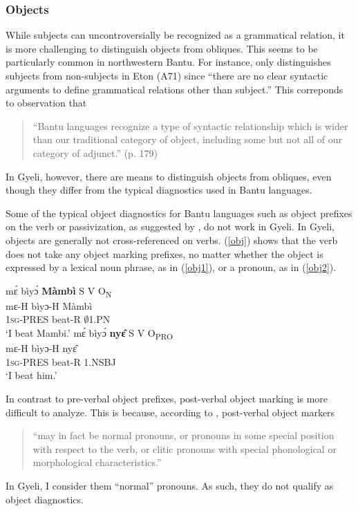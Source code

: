 \subsubsection{Objects}
\label{sec:HLinker}

While subjects can uncontroversially be recognized as a grammatical relation, it is more challenging to distinguish objects from obliques. This seems to be particularly common in northwestern Bantu. For instance, \citet[287]{velde2008} only distinguishes subjects from non-subjects in Eton (A71) since ``there are no clear syntactic arguments to define grammatical relations other than subject.'' This correponds to  observation that 
\begin{quote}
``Bantu languages recognize a type of syntactic relationship which is wider than our traditional category of object, including some but not all of our category of adjunct.'' (p. 179) \end{quote}
 In Gyeli, however, there are means to distinguish objects from obliques, even though they differ from the typical diagnostics used in Bantu languages.


Some of the typical object diagnostics for Bantu languages such as object prefixes on the verb or passivization, as suggested by \citet{schadeberg95}, do not work in Gyeli.  In Gyeli, objects are generally not cross-referenced on verbs.  (\ref{obj}) shows that the verb does not take any object marking prefixes, no matter whether the object is expressed by a lexical noun phrase, as in (\ref{obj1}), or a pronoun, as in (\ref{obj2}).

\begin{exe} 
\ex\label{obj}
\begin{xlist}
\ex\label{obj1}
  \glll    mɛ́ bìyɔ́ {\bfseries Màmbì} \hfill S V O\textsubscript{N} \\
		mɛ-H bìyɔ-H Màmbì   \\
             1\textsc{sg}-PRES beat-R $\emptyset$1.PN    \\
    \trans `I beat Mambi.'
\ex\label{obj2}
  \glll    mɛ́ bìyɔ́ {\bfseries nyɛ̂} \hfill S V O\textsubscript{PRO} \\
	mɛ-H bìyɔ-H nyɛ̂     \\
              1\textsc{sg}-PRES beat-R 1.NSBJ  \\
    \trans `I beat him.'
\end{xlist}
\end{exe}

\noindent In contrast to pre-verbal object prefixes, post-verbal object marking is more difficult to analyze. This is because, according to \citet[239]{marten2012}, post-verbal object markers \begin{quote}  ``may in fact be normal pronouns, or pronouns in some special position with respect to the verb, or clitic pronouns with special phonological or morphological characteristics.'' \end{quote} In Gyeli, I consider them ``normal'' pronouns. As such, they do not qualify as object diagnostics.

